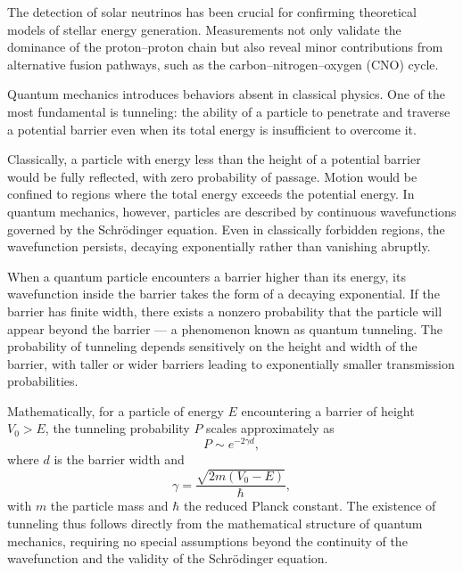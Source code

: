 The detection of solar neutrinos has been crucial for confirming theoretical models of stellar energy generation. Measurements not only validate the dominance of the proton–proton chain but also reveal minor contributions from alternative fusion pathways, such as the carbon–nitrogen–oxygen (CNO) cycle.

Quantum mechanics introduces behaviors absent in classical physics. One of the most fundamental is tunneling: the ability of a particle to penetrate and traverse a potential barrier even when its total energy is insufficient to overcome it. 

Classically, a particle with energy less than the height of a potential barrier would be fully reflected, with zero probability of passage. Motion would be confined to regions where the total energy exceeds the potential energy. In quantum mechanics, however, particles are described by continuous wavefunctions governed by the Schrödinger equation. Even in classically forbidden regions, the wavefunction persists, decaying exponentially rather than vanishing abruptly.

When a quantum particle encounters a barrier higher than its energy, its wavefunction inside the barrier takes the form of a decaying exponential. If the barrier has finite width, there exists a nonzero probability that the particle will appear beyond the barrier — a phenomenon known as quantum tunneling. The probability of tunneling depends sensitively on the height and width of the barrier, with taller or wider barriers leading to exponentially smaller transmission probabilities.

Mathematically, for a particle of energy $E$ encountering a barrier of height $V_0 > E$, the tunneling probability $P$ scales approximately as
\[
P \sim e^{-2\gamma d},
\]
where $d$ is the barrier width and
\[
\gamma = \frac{\sqrt{2m(V_0 - E)}}{\hbar},
\]
with $m$ the particle mass and $\hbar$ the reduced Planck constant. The existence of tunneling thus follows directly from the mathematical structure of quantum mechanics, requiring no special assumptions beyond the continuity of the wavefunction and the validity of the Schrödinger equation.


